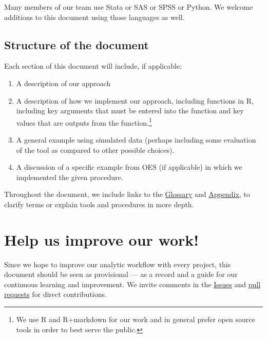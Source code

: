 \documentclass[
  12pt,
]{book}
\providecommand{\tightlist}{%
  \setlength{\itemsep}{0pt}\setlength{\parskip}{0pt}}
\theoremstyle{definition}
\theoremstyle{definition}
\theoremstyle{definition}
\theoremstyle{remark}
\begin{document}
Many members of our team use Stata or SAS or SPSS or Python. We welcome
additions to this document using those languages as well.

\hypertarget{structure-of-the-document}{%
\subsection*{Structure of the
document}\label{structure-of-the-document}}

Each section of this document will include, if applicable:

\begin{enumerate}
\def\labelenumi{\arabic{enumi}.}
\tightlist
\item
  A description of our approach
\item
  A description of how we implement our approach, including functions in
  R, including key arguments that must be entered into the function and
  key values that are outputs from the function.\footnote{We use R and
    R+markdown for our work and in general prefer open source tools in
    order to best serve the public.}
\item
  A general example using simulated data (perhaps including some
  evaluation of the tool as compared to other possible choices).
\item
  A discussion of a specific example from OES (if applicable) in which
  we implemented the given procedure.
\end{enumerate}

Throughout the document, we include links to the
\protect\hyperlink{glossary}{Glossary} and
\protect\hyperlink{appendix}{Appendix}, to clarify terms or explain
tools and procedures in more depth.

\hypertarget{help-us-improve-our-work}{%
\section*{Help us improve our work!}\label{help-us-improve-our-work}}

Since we hope to improve our analytic workflow with every project, this
document should be seen as provisional --- as a record and a guide for
our continuous learning and improvement. We invite comments in the
\href{https://github.com/gsa-oes/sop/issues}{Issues} and
\href{https://help.github.com/articles/creating-a-pull-request/}{pull
requests} for direct contributions.
\end{document}

